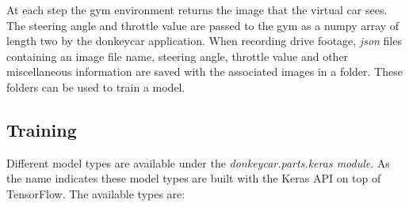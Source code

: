 \documentclass[conference]{IEEEtran}
\begin{document}
At each step the gym environment returns the image that the virtual car sees. 
The steering angle and throttle value are passed to the gym as a numpy array of length two by the donkeycar application. 
When recording drive footage, \textit{json} files containing an image file name, steering angle, throttle value and other miscellaneous information are saved with the associated images in a folder. 
These folders can be used to train a model.

\subsection{Training}

Different model types are available under the \textit{donkeycar.parts.keras module}.
As the name indicates these model types are built with the Keras API on top of TensorFlow.
The available types are:
\end{document}
